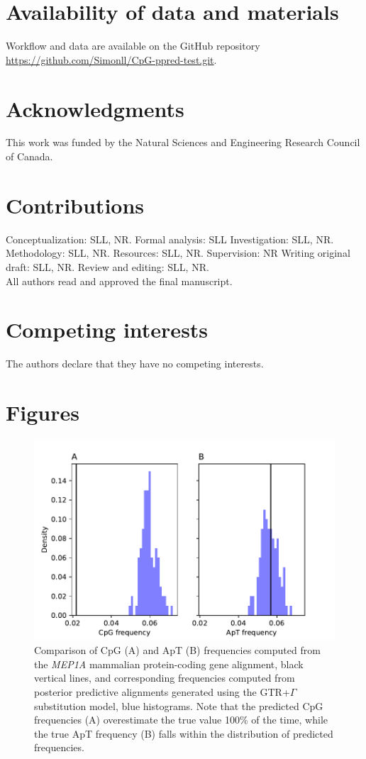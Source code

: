 \documentclass{article}
\begin{document}
\section*{Availability of data and materials}
Workflow and data are available on the GitHub repository \url{https://github.com/Simonll/CpG-ppred-test.git}.

\section*{Acknowledgments}
This work was funded by the Natural Sciences and Engineering Research Council of Canada.

\section*{Contributions}
Conceptualization: SLL, NR. Formal analysis: SLL Investigation: SLL, NR. Methodology: SLL, NR. Resources: SLL, NR. Supervision: NR Writing original draft: SLL, NR. Review and editing: SLL, NR. \\
All authors read and approved the final manuscript.

\section*{Competing interests}
The authors declare that they have no competing interests.

\newpage
\section*{Figures}

\begin{figure}[H]
  \centering
  \includegraphics[width=\textwidth,height=\textheight,keepaspectratio]{figures/figure1.pdf}
  \caption{Comparison of CpG (A) and ApT (B) frequencies computed from the \emph{MEP1A} mammalian protein-coding gene alignment, black vertical lines, and corresponding frequencies computed from posterior predictive alignments generated using the GTR+$\Gamma$ substitution model, blue histograms. Note that the predicted CpG frequencies (A) overestimate the true value 100\% of the time, while the true ApT frequency (B) falls within the distribution of predicted frequencies.}
  \label{fig:figure_1}
\end{figure}
\end{document}
